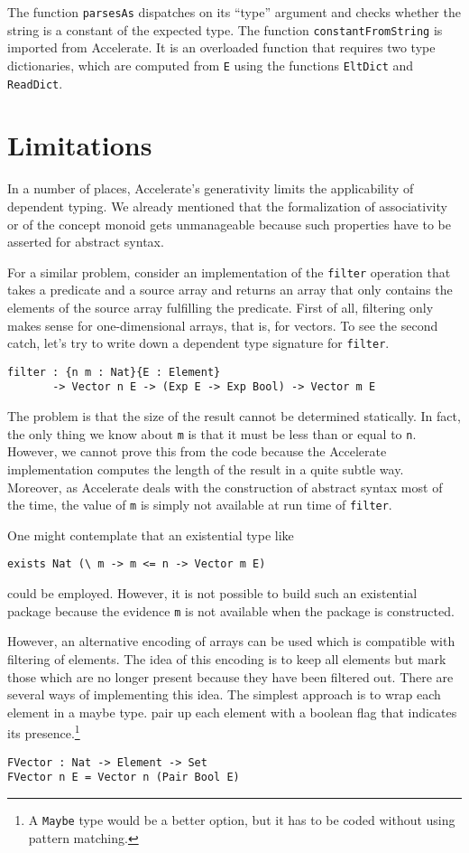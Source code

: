 \documentclass{llncs}
\begin{document}
The function \texttt{parsesAs} dispatches on its ``type'' argument and
checks whether the string is a constant of the expected type. The
function \texttt{constantFromString} is imported from Accelerate.
It is an overloaded function that requires two type dictionaries,
which are computed from \texttt{E} using the functions \texttt{EltDict}
and \texttt{ReadDict}. 

\section{Limitations}
\label{sec:limitations}

In a number of places, Accelerate's generativity limits the
applicability of dependent typing. We already mentioned that the
formalization of associativity or of the concept monoid gets
unmanageable because such properties have to be asserted for abstract syntax.

For a similar problem, consider an implementation of the \texttt{filter}
operation that takes a predicate and a source array and returns an
array that only contains the elements of the source array fulfilling
the predicate.  First of all, filtering only makes sense for
one-dimensional arrays, that is, for vectors. To see the second catch,
let's try to write down a dependent type signature for \texttt{filter}.
\begin{verbatim}
filter : {n m : Nat}{E : Element}
       -> Vector n E -> (Exp E -> Exp Bool) -> Vector m E
\end{verbatim}
The problem is that the size of the result
cannot be determined statically. In fact, the only thing we know about
\texttt{m} is that it must be less than or equal to
\texttt{n}. However, we cannot prove this from the code because the
Accelerate implementation computes the length of the result in a quite
subtle way. Moreover, as Accelerate deals with the construction of
abstract syntax most of the time, the value of \texttt{m} is simply
not available at run time of \texttt{filter}. 

One might contemplate that an existential type like
\begin{verbatim}
exists Nat (\ m -> m <= n -> Vector m E)
\end{verbatim}
could be employed. However, it is not possible to build such an
existential package because the evidence \texttt{m} is not available
when the package is constructed.

However, an alternative encoding of arrays can be
used which is compatible with filtering of elements. The idea of this
encoding is to keep all elements but mark those which are no longer
present because they have been filtered out.
There are several ways of implementing this idea. The simplest
approach is to wrap each element in a maybe type.
pair up each element with a boolean flag that indicates
its presence.\footnote{A \texttt{Maybe} type would be a better option,
  but it has to be coded without using pattern matching.}
\begin{verbatim}
FVector : Nat -> Element -> Set
FVector n E = Vector n (Pair Bool E)
\end{verbatim}
\end{document}
